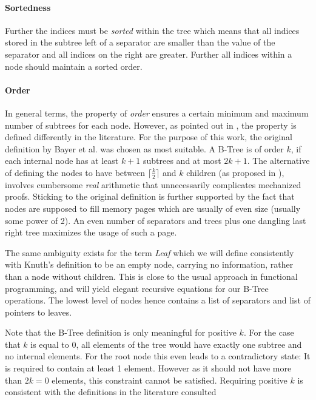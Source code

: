 \paragraph{Sortedness} Further the indices must be \textit{sorted} within the tree which means that all indices stored
in the subtree left of a separator are smaller than the value of the separator
and all indices on the right are greater.
Further all indices within a node should maintain a sorted order.

\paragraph{Order} In general terms, the property of \textit{order} ensures a certain minimum and maximum
number of subtrees for each node.
However, as pointed out in \parencite{DBLP:books/daglib/0095349_mod},
the property is defined differently in the literature.
For the purpose of this work, the original definition by Bayer et al. was chosen as most suitable.
A B-Tree is of order $k$, if each internal node has at least $k+1$
subtrees and at most $2k+1$.
The alternative of defining the nodes to have between $\lceil \frac{k}{2} \rceil$
and $k$ children (as proposed in \parencite{DBLP:books/lib/Knuth98a}),
involves cumbersome \textit{real} arithmetic that unnecessarily complicates
mechanized proofs.
Sticking to the original definition is further supported by the fact that nodes are supposed
to fill memory pages which are usually of even size (usually some power of 2).
An even number of separators and trees plus one dangling last right tree maximizes
the usage of such a page.

The same ambiguity exists for the term \textit{Leaf} which we will define consistently with Knuth's definition \parencite{DBLP:books/lib/Knuth98a}
to be an empty node, carrying no information,
rather than a node without children.
This is close to the usual approach in functional programming,
and will yield elegant recursive equations for our B-Tree operations.
The lowest level of nodes hence contains a list of separators and
list of pointers to leaves.

Note that the B-Tree definition is only meaningful for positive $k$.
For the case that $k$ is equal to 0,
all elements of the tree would have exactly one subtree
and no internal elements.
For the root node this even leads to a contradictory state:
It is required to contain at least 1 element.
However as it should not have more than $2k = 0$ elements,
this constraint cannot be satisfied.
Requiring positive $k$ is consistent with the definitions
in the literature consulted \parencite{DBLP:journals/acta/BayerM72,DBLP:journals/csur/Comer79,DBLP:books/daglib/0023376}

